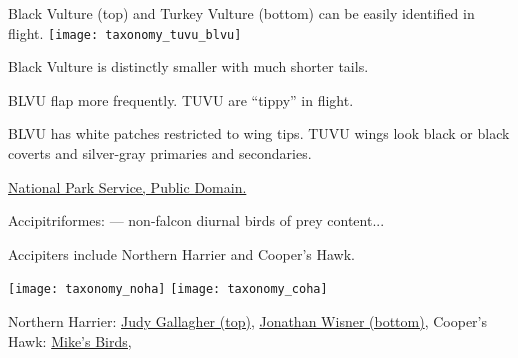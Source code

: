 \documentclass[t]{beamer}
\newcommand{\backoneline}{\vspace{-\baselineskip}}
\begin{document}
\begin{frame}{Black Vulture (top) and Turkey Vulture (bottom) can be easily identified in flight.}
\texttt{[image: taxonomy\_tuvu\_blvu]}

Black Vulture is distinctly smaller with much shorter tails. 

\vspace{0.5\baselineskip}

BLVU flap more frequently. TUVU are “tippy” in flight.
\vspace{0.5\baselineskip}

BLVU has white patches restricted to wing tips. TUVU wings look black or black coverts and silver-gray primaries and secondaries.

\tinyfill \href{https://www.nps.gov/articles/netn-species-spotlight-vultures.htm}{National Park Service, Public Domain.}
\end{frame}

\begin{frame}{Accipitriformes:  — non-falcon diurnal birds of prey}
content...
\end{frame}

\begin{frame}{Accipiters include Northern Harrier and Cooper's Hawk.}
\backoneline

\begin{multicols}{2}
\texttt{[image: taxonomy\_noha]} \hfill
\texttt{[image: taxonomy\_coha]}

\end{multicols}

\vfilll

\tiny Northern Harrier: \href{https://flickr.com/photos/52450054@N04/52848994837}{Judy Gallagher (top)}, \href{https://flickr.com/photos/jwcolo/8714842140}{Jonathan Wisner (bottom)},  \hfill Cooper's Hawk: \href{https://flickr.com/photos/pazzani/36473380835}{Mike's Birds, }

\end{frame}
\end{document}
